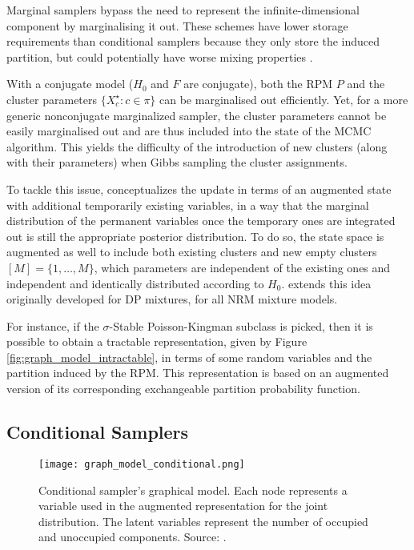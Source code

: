 Marginal samplers bypass the need to represent the infinite-dimensional component by marginalising it out. These schemes have lower storage requirements than conditional samplers because they only store the induced partition, but could potentially have worse mixing properties \cite{LomeliThesis}.

With a conjugate model ($H_0$ and $F$ are conjugate), both the \gls{RPM} $P$ and the cluster parameters $\{X_c^\star: c \in \pi \}$ can be marginalised out efficiently. Yet, for a more generic nonconjugate marginalized sampler, the cluster parameters cannot be easily marginalised out and are thus included into the state of the \gls{MCMC} algorithm. This yields the difficulty of the introduction of new clusters (along with their parameters) when Gibbs sampling the cluster assignments.

To tackle this issue, \cite{Neal:2000hb} conceptualizes the update in terms of an augmented state with additional temporarily existing variables, in a way that the marginal distribution of the permanent variables once the temporary ones are integrated out is still the appropriate posterior distribution.
To do so, the state space is augmented as well to include both existing clusters and new empty clusters $[M] = \{1, \dots , M\}$, which parameters are independent of the existing ones and independent and identically distributed according to $H_0$.
\cite{Favaro:2013fl} extends this idea originally developed for \gls{DP} mixtures, for all \gls{NRM} mixture models.

For instance, if the $\sigma$-Stable Poisson-Kingman subclass is picked, then it is possible to obtain a tractable representation, given by Figure \ref{fig:graph_model_intractable}, in terms of some random variables and the partition induced by the \gls{RPM}.
This representation is based on an augmented version of its corresponding exchangeable partition probability function.

\subsection{Conditional Samplers}
\begin{figure}[h!]
\centering
    \texttt{[image: graph\_model\_conditional.png]} 
    \caption{Conditional sampler’s graphical model. Each node represents a variable used in the augmented representation for the joint distribution. The latent variables represent the number of occupied and unoccupied components. Source: \cite{LomeliThesis}.} 
    \label{fig:graph_model_conditional} 
\end{figure}

